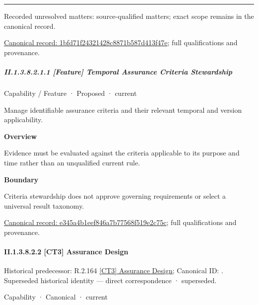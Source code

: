 \medskip\hrule\medskip

{\small Recorded unresolved matters: source-qualified matters; exact scope remains in the canonical record.}\par
{\footnotesize \href{../../../../continuum/strategy/capability/1bfd71f24321428c8871b587d413f47e.md}{Canonical record: 1bfd71f24321428c8871b587d413f47e}; full qualifications and provenance.}\par
\subparagraph*{II.1.3.8.2.1.1 [Feature] Temporal Assurance Criteria Stewardship}
\label{navigation:II.1.3.8.2.1.1}

\label{element:e345a4b1eef846a7b77568f519e2c75c}
{\small Capability / Feature · Proposed · current}\par

Manage identifiable assurance criteria and their relevant temporal and version applicability.



\textbf{Overview}



Evidence must be evaluated against the criteria applicable to its purpose and time rather than an unqualified current rule.



\textbf{Boundary}



Criteria stewardship does not approve governing requirements or select a universal result taxonomy.


{\footnotesize \href{../../../../continuum/strategy/capability/feature/e345a4b1eef846a7b77568f519e2c75c.md}{Canonical record: e345a4b1eef846a7b77568f519e2c75c}; full qualifications and provenance.}\par
\paragraph*{II.1.3.8.2.2 [CT3] Assurance Design}
\label{navigation:II.1.3.8.2.2}

{\small Historical predecessor: R.2.164 \hyperref[element:e1b8db7c95fa4e7ea296351a03532e24]{[CT3] Assurance Design}; Canonical ID: \texttt{}. Superseded historical identity — direct correspondence · superseded.}\par
\label{element:71c8a612b88f4ecba049e94d506bd0c2}
{\small Capability · Canonical · current}\par

